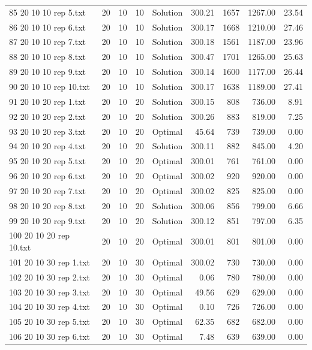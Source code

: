 \begin{longtable}{lrrllrrrr}
85 20 10 10 rep 5.txt & 20 & 10 & 10 & Solution & 300.21 & 1657 & 1267.00 & 23.54\\
86 20 10 10 rep 6.txt & 20 & 10 & 10 & Solution & 300.17 & 1668 & 1210.00 & 27.46\\
87 20 10 10 rep 7.txt & 20 & 10 & 10 & Solution & 300.18 & 1561 & 1187.00 & 23.96\\
88 20 10 10 rep 8.txt & 20 & 10 & 10 & Solution & 300.47 & 1701 & 1265.00 & 25.63\\
89 20 10 10 rep 9.txt & 20 & 10 & 10 & Solution & 300.14 & 1600 & 1177.00 & 26.44\\
90 20 10 10 rep 10.txt & 20 & 10 & 10 & Solution & 300.17 & 1638 & 1189.00 & 27.41\\
91 20 10 20 rep 1.txt & 20 & 10 & 20 & Solution & 300.15 & 808 & 736.00 &  8.91\\
92 20 10 20 rep 2.txt & 20 & 10 & 20 & Solution & 300.26 & 883 & 819.00 &  7.25\\
93 20 10 20 rep 3.txt & 20 & 10 & 20 & Optimal & 45.64 & 739 & 739.00 &  0.00\\
94 20 10 20 rep 4.txt & 20 & 10 & 20 & Solution & 300.11 & 882 & 845.00 &  4.20\\
95 20 10 20 rep 5.txt & 20 & 10 & 20 & Optimal & 300.01 & 761 & 761.00 &  0.00\\
96 20 10 20 rep 6.txt & 20 & 10 & 20 & Optimal & 300.02 & 920 & 920.00 &  0.00\\
97 20 10 20 rep 7.txt & 20 & 10 & 20 & Optimal & 300.02 & 825 & 825.00 &  0.00\\
98 20 10 20 rep 8.txt & 20 & 10 & 20 & Solution & 300.06 & 856 & 799.00 &  6.66\\
99 20 10 20 rep 9.txt & 20 & 10 & 20 & Solution & 300.12 & 851 & 797.00 &  6.35\\
100 20 10 20 rep 10.txt & 20 & 10 & 20 & Optimal & 300.01 & 801 & 801.00 &  0.00\\
101 20 10 30 rep 1.txt & 20 & 10 & 30 & Optimal & 300.02 & 730 & 730.00 &  0.00\\
102 20 10 30 rep 2.txt & 20 & 10 & 30 & Optimal &  0.06 & 780 & 780.00 &  0.00\\
103 20 10 30 rep 3.txt & 20 & 10 & 30 & Optimal & 49.56 & 629 & 629.00 &  0.00\\
104 20 10 30 rep 4.txt & 20 & 10 & 30 & Optimal &  0.10 & 726 & 726.00 &  0.00\\
105 20 10 30 rep 5.txt & 20 & 10 & 30 & Optimal & 62.35 & 682 & 682.00 &  0.00\\
106 20 10 30 rep 6.txt & 20 & 10 & 30 & Optimal &  7.48 & 639 & 639.00 &  0.00\\

\end{longtable}
